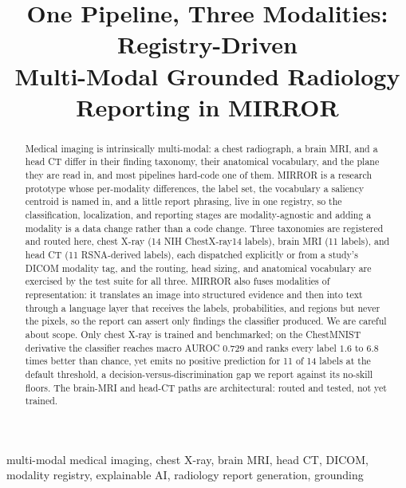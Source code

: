 \documentclass[conference]{IEEEtran}
\begin{document}
\title{One Pipeline, Three Modalities: Registry-Driven\\
Multi-Modal Grounded Radiology Reporting in MIRROR}

\author{%
}

\maketitle

\begin{abstract}
Medical imaging is intrinsically multi-modal: a chest radiograph, a brain MRI, and
a head CT differ in their finding taxonomy, their anatomical vocabulary, and the
plane they are read in, and most pipelines hard-code one of them. MIRROR is a
research prototype whose per-modality differences, the label set, the vocabulary a
saliency centroid is named in, and a little report phrasing, live in one registry,
so the classification, localization, and reporting stages are modality-agnostic and
adding a modality is a data change rather than a code change. Three taxonomies are
registered and routed here, chest X-ray (14 NIH ChestX-ray14 labels), brain MRI (11
labels), and head CT (11 RSNA-derived labels), each dispatched explicitly or from a
study's DICOM modality tag, and the routing, head sizing, and anatomical vocabulary
are exercised by the test suite for all three. MIRROR also fuses modalities of
representation: it translates an image into structured evidence and then into text
through a language layer that receives the labels, probabilities, and regions but
never the pixels, so the report can assert only findings the classifier produced.
We are careful about scope. Only chest X-ray is trained and benchmarked; on the
ChestMNIST derivative the classifier reaches macro AUROC $0.729$ and ranks every
label $1.6$ to $6.8$ times better than chance, yet emits no positive prediction for
11 of 14 labels at the default threshold, a decision-versus-discrimination gap we
report against its no-skill floors. The brain-MRI and head-CT paths are
architectural: routed and tested, not yet trained.
\end{abstract}

\begin{IEEEkeywords}
multi-modal medical imaging, chest X-ray, brain MRI, head CT, DICOM, modality
registry, explainable AI, radiology report generation, grounding
\end{IEEEkeywords}
\end{document}
